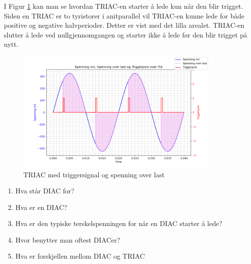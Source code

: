 \begin{solution}[name=Løsningsforslag]
	I Figur \ref{fig:triacTriggplotSOL} kan man se hvordan TRIAC-en starter å lede kun når den blir trigget. Siden en TRIAC er to tyristorer i anitparallel vil TRIAC-en kunne lede for både positive og negative halvperioder. Detter er vist med det lilla arealet. TRIAC-en slutter å lede ved nullgjennomgangen og starter ikke å lede før den blir trigget på nytt.
	
	\begin{figure}[H]
		\centering
		\includegraphics[width=0.9\textwidth]{tyristor/plot/triacSOL.png}
		\caption{TRIAC med triggersignal og spenning over last}
		\label{fig:triacTriggplotSOL}
	\end{figure}
	
\end{solution}



\begin{question}[name=Spørsmål, topic=tyristor]
	\begin{enumerate}[label=\roman*)]
	\item Hva står DIAC for?
	\item Hva er en DIAC?
	\item Hva er den typiske terskelspenningen for når en DIAC starter å lede?
	\item Hvor benytter man oftest DIACer?
	\item Hva er forskjellen mellom DIAC og TRIAC
	\end{enumerate}

\end{question}

\vspace{0.5cm} %

